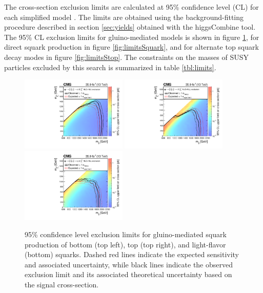 The cross-section exclusion limits are calculated at 95\% confidence level (CL) for each simplified model \cite{0954-3899-28-10-313, Junk:1999kv, Cowan:2010js}. The limits are obtained using the background-fitting procedure described in section \ref{sec:yields} obtained with the higgsCombine tool. The 95\% CL exclusion limits for gluino-mediated models is shown in figure \ref{fig:limitsGluino}, for direct squark production in figure \ref{fig:limitsSquark}, and for alternate top squark decay modes in figure \ref{fig:limitsStop}. The constraints on the masses of SUSY particles excluded by this search is summarized in table \ref{tbl:limits}.
\begin{figure}
	\centering
	\includegraphics[width=0.45\textwidth]{results/figs/interpretations/T1bbbb_35p9ifb_Moriond2017_Mar07_XSEC}
	\includegraphics[width=0.45\textwidth]{results/figs/interpretations/T1tttt_35p9ifb_Moriond2017_Mar07_XSEC}
	\includegraphics[width=0.45\textwidth]{results/figs/interpretations/T1qqqq_35p9ifb_Moriond2017_Mar07_XSEC}
	\caption{95\% confidence level exclusion limits for gluino-mediated squark production of bottom (top left), top (top right), and light-flavor (bottom) squarks. Dashed red lines indicate the expected sensitivity and associated uncertainty, while black lines indicate the observed exclusion limit and its associated theoretical uncertainty based on the signal cross-section.}
	\label{fig:limitsGluino}
\end{figure}
